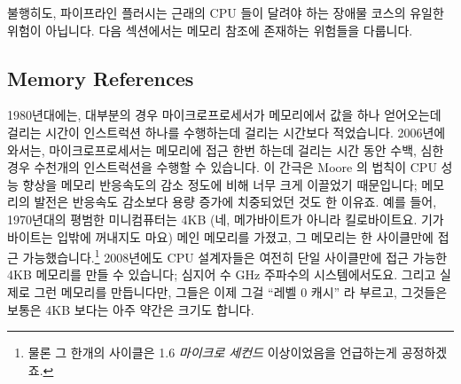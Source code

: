 불행히도, 파이프라인 플러시는 근래의 CPU 들이 달려야 하는 장애물 코스의 유일한
위험이 아닙니다.
다음 섹션에서는 메모리 참조에 존재하는 위험들을 다룹니다.

\subsection{Memory References}
\label{sec:cpu:Memory References}

1980년대에는, 대부분의 경우 마이크로프로세서가 메모리에서 값을 하나 얻어오는데
걸리는 시간이 인스트럭션 하나를 수행하는데 걸리는 시간보다 적었습니다.
2006년에 와서는, 마이크로프로세서는 메모리에 접근 한번 하는데 걸리는 시간 동안
수백, 심한 경우 수천개의 인스트럭션을 수행할 수 있습니다.
이 간극은 Moore 의 법칙이 CPU 성능 향상을 메모리 반응속도의 감소 정도에 비해
너무 크게 이끌었기 때문입니다; 메모리의 발전은 반응속도 감소보다 용량 증가에
치중되었던 것도 한 이유죠.
예를 들어, 1970년대의 평범한 미니컴퓨터는 4KB (네, 메가바이트가 아니라
킬로바이트요. 기가바이트는 입밖에 꺼내지도 마요) 메인 메모리를 가졌고, 그
메모리는 한 사이클만에 접근 가능했습니다.\footnote{
	물론 그 한개의 사이클은 1.6 \emph{마이크로 세컨드} 이상이었음을
	언급하는게 공정하겠죠.}
2008년에도 CPU 설계자들은 여전히 단일 사이클만에 접근 가능한 4KB 메모리를 만들
수 있습니다; 심지어 수 GHz 주파수의 시스템에서도요.
그리고 실제로 그런 메모리를 만듭니다만, 그들은 이제 그걸 ``레벨 0 캐시'' 라
부르고, 그것들은 보통은 4KB 보다는 아주 약간은 크기도 합니다.

